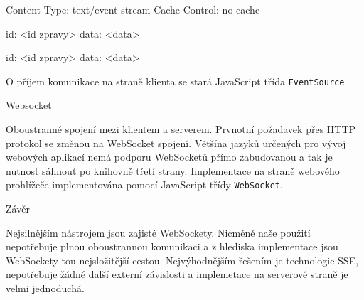 \begtt
Content-Type: text/event-stream
Cache-Control: no-cache

id: <id zpravy>
data: <data>

id: <id zpravy>
data: <data>
\endtt

\noindent
O příjem komunikace na straně klienta se stará JavaScript třída {\tt EventSource}.

\secc Websocket

Oboustranné spojení mezi klientem a serverem.
Prvnotní požadavek přes HTTP protokol se změnou na WebSocket spojení.
Většína jazyků určených pro vývoj webových aplikací nemá podporu WebSocketů přímo zabudovanou a tak je nutnost sáhnout po knihovně třetí strany.
Implementace na straně webového prohlížeče implementována pomocí JavaScript třídy {\tt WebSocket}.

\secc Závěr

Nejsilnějším nástrojem jsou zajisté WebSockety.
Nicméně naše použití nepotřebuje plnou oboustrannou komunikaci a z hlediska implementace jsou WebSockety tou nejsložitější cestou.
Nejvýhodnějším řešením je technologie SSE, nepotřebuje žádné další externí závislosti a implemetace na serverové straně je velmi jednoduchá.